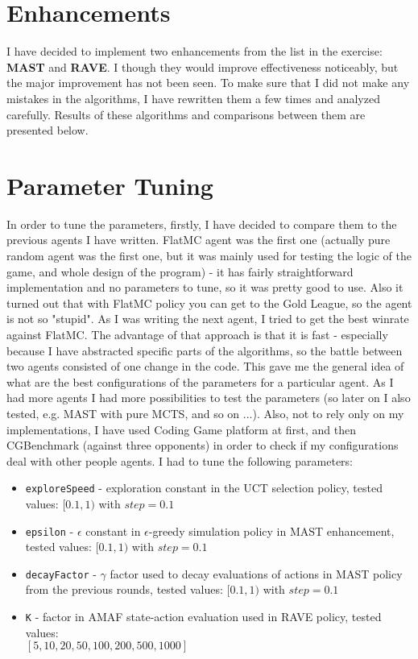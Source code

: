 \documentclass[11pt]{article}
\begin{document}
	\section{Enhancements}
	I have decided to implement two enhancements from the list in the exercise: \textbf{MAST} and \textbf{RAVE}. I though they would improve effectiveness noticeably, but the major improvement has not been seen. To make sure that I did not make any mistakes in the algorithms, I have rewritten them a few times and analyzed carefully. Results of these algorithms and comparisons between them are presented below.
	
	\section{Parameter Tuning}
	In order to tune the parameters, firstly, I have decided to compare them to the previous agents I have written. FlatMC agent was the first one (actually pure random agent was the first one, but it was mainly used for testing the logic of the game, and whole design of the program) - it has fairly straightforward implementation and no parameters to tune, so it was pretty good to use. Also it turned out that with FlatMC policy you can get to the Gold League, so the agent is not so "stupid". As I was writing the next agent, I tried to get the best winrate against FlatMC. The advantage of that approach is that it is fast - especially because I have abstracted specific parts of the algorithms, so the battle between two agents consisted of one change in the code. This gave me the general idea of what are the best configurations of the parameters for a particular agent. As I had more agents I had more possibilities to test the parameters (so later on I also tested, e.g. MAST with pure MCTS, and so on ...). Also, not to rely only on my implementations, I have used Coding Game platform at first, and then CGBenchmark (against three opponents) in order to check if my configurations deal with other people agents. I had to tune the following parameters:
	\begin{itemize}
		\item \texttt{exploreSpeed} - exploration constant in the UCT selection policy, tested values: $[0.1, 1)$ with $step=0.1$
		\item \texttt{epsilon} - $\epsilon$ constant in $\epsilon$-greedy simulation policy in MAST enhancement, tested values: $[0.1, 1)$ with $step=0.1$
		\item \texttt{decayFactor} - $\gamma$ factor used to decay evaluations of actions in MAST policy from the previous rounds, tested values: $[0.1, 1)$ with $step=0.1$
		\item \texttt{K} - factor in AMAF state-action evaluation used in RAVE policy, tested values: \\ $[5, 10, 20, 50, 100, 200, 500, 1000]$
	\end{itemize}
\end{document}
